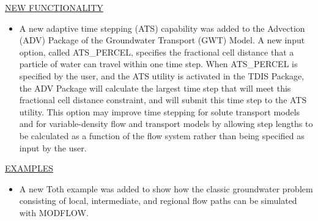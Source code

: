 	
	\item \currentmodflowversion
	
	\underline{NEW FUNCTIONALITY}
	\begin{itemize}
		\item A new adaptive time stepping (ATS) capability was added to the Advection (ADV) Package of the Groundwater Transport (GWT) Model.  A new input option, called ATS\_PERCEL, specifies the fractional cell distance that a particle of water can travel within one time step.  When ATS\_PERCEL is specified by the user, and the ATS utility is activated in the TDIS Package, the ADV Package will calculate the largest time step that will meet this fractional cell distance constraint, and will submit this time step to the ATS utility.  This option may improve time stepping for solute transport models and for variable-density flow and transport models by allowing step lengths to be calculated as a function of the flow system rather than being specified as input by the user.
	\end{itemize}

	\underline{EXAMPLES}
	\begin{itemize}
		\item A new Toth example was added to show how the classic groundwater problem consisting of local, intermediate, and regional flow paths can be simulated with MODFLOW.
	\end{itemize}

